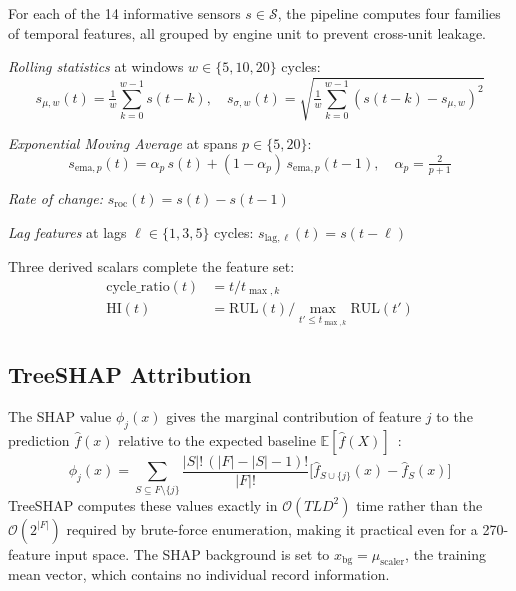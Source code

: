 \documentclass[10pt, journal, letterpaper]{IEEEtran}
\begin{document}
For each of the 14 informative sensors $s \in \mathcal{S}$, the pipeline
computes four families of temporal features, all grouped by engine unit to
prevent cross-unit leakage.

\textit{Rolling statistics} at windows $w \in \{5, 10, 20\}$ cycles:
\begin{equation}
  s_{\mu,w}(t) = \tfrac{1}{w}\textstyle\sum_{k=0}^{w-1}s(t{-}k), \quad
  s_{\sigma,w}(t) = \sqrt{\tfrac{1}{w}\textstyle\sum_{k=0}^{w-1}
    (s(t{-}k) - s_{\mu,w})^2}
\end{equation}

\textit{Exponential Moving Average} at spans $p \in \{5, 20\}$:
\begin{equation}
  s_{\text{ema},p}(t) = \alpha_p\, s(t) + (1-\alpha_p)\, s_{\text{ema},p}(t{-}1),
  \quad \alpha_p = \tfrac{2}{p+1}
\end{equation}

\textit{Rate of change:} $s_{\text{roc}}(t) = s(t) - s(t-1)$

\textit{Lag features} at lags $\ell \in \{1, 3, 5\}$ cycles:
$s_{\text{lag},\ell}(t) = s(t-\ell)$

Three derived scalars complete the feature set:
\begin{align}
  \mathrm{cycle\_ratio}(t) &= t / t_{\max,k}\\
  \mathrm{HI}(t) &= \mathrm{RUL}(t) / \max_{t' \leq t_{\max,k}} \mathrm{RUL}(t')
\end{align}

\subsection{TreeSHAP Attribution}

The SHAP value $\phi_j(x)$ gives the marginal contribution of feature $j$ to
the prediction $\hat{f}(x)$ relative to the expected baseline
$\mathbb{E}[\hat{f}(X)]$~\cite{lundberg2017}:
\begin{equation}
  \phi_j(x) = \!\!\sum_{S \subseteq F\setminus\{j\}}\!\!
    \frac{|S|!\,(|F|-|S|-1)!}{|F|!}
    \bigl[\hat{f}_{S\cup\{j\}}(x) - \hat{f}_{S}(x)\bigr]
  \label{eq:shap}
\end{equation}
TreeSHAP computes these values exactly in $\mathcal{O}(TLD^2)$ time rather
than the $\mathcal{O}(2^{|F|})$ required by brute-force enumeration, making
it practical even for a 270-feature input space. The SHAP background is set
to $x_{\text{bg}} = \mu_{\text{scaler}}$, the training mean vector, which
contains no individual record information.
\end{document}

